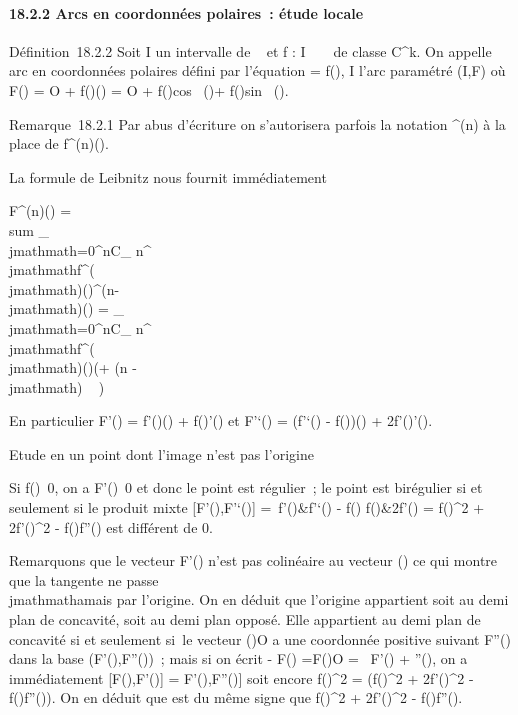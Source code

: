 \documentclass[]{article}
\begin{document}
\paragraph{18.2.2 Arcs en coordonnées polaires~: étude locale}

Définition~18.2.2 Soit I un intervalle de ~ et f : I \rightarrow~ ~ de classe
C^k. On appelle arc en coordonnées polaires défini par
l'équation \rho = f(\theta), \theta \in I l'arc paramétré (I,F) où F(\theta) = O +
f(\theta)\vecu(\theta) = O + f(\theta)cos~
(\theta)\vec\imath + f(\theta)sin~
(\theta).

Remarque~18.2.1 Par abus d'écriture on s'autorisera parfois la notation
\rho^(n) à la place de f^(n)(\theta).

La formule de Leibnitz nous fournit immédiatement

F^(n)(\theta) = \\sum
_\\jmathmath=0^nC_
n^\\jmathmathf^(\\jmathmath)(\theta)\vecu^(n-\\jmathmath)(\theta)
= \sum _\\jmathmath=0^nC_
n^\\jmathmathf^(\\jmathmath)(\theta)\vecu(\theta + (n - \\jmathmath) \pi~
 )

En particulier F'(\theta) = f'(\theta)\vecu(\theta) +
f(\theta)\vecu'(\theta) et F'`(\theta) = (f'`(\theta) -
f(\theta))\vecu(\theta) + 2f'(\theta)\vecu'(\theta).

Etude en un point dont l'image n'est pas l'origine

Si f(\theta)\neq~0, on a
F'(\theta)\neq~0 et donc le point est régulier~; le
point est birégulier si et seulement si le produit mixte
{[}F'(\theta),F'`(\theta){]} = \left
\matrix\,f'(\theta)&f'`(\theta) - f(\theta)
\cr f(\theta)&2f'(\theta) \right  =
f(\theta)^2 + 2f'(\theta)^2 - f(\theta)f''(\theta) est différent de 0.

Remarquons que le vecteur F'(\theta) n'est pas colinéaire au vecteur
\overrightarrowOF(\theta) ce qui montre que la tangente ne
passe \\jmathmathamais par l'origine. On en déduit que l'origine appartient soit
au demi plan de concavité, soit au demi plan opposé. Elle appartient au
demi plan de concavité si et seulement si~le vecteur
\overrightarrowF(\theta)O a une coordonnée positive
suivant F''(\theta) dans la base (F'(\theta),F''(\theta))~; mais si on écrit - F(\theta)
=\overrightarrow F(\theta)O = \lambda~F'(\theta) + \muF''(\theta), on a
immédiatement {[}F(\theta),F'(\theta){]} = \mu{[}F'(\theta),F''(\theta){]} soit encore
f(\theta)^2 = \mu(f(\theta)^2 + 2f'(\theta)^2 -
f(\theta)f''(\theta)). On en déduit que \mu est du même signe que f(\theta)^2
+ 2f'(\theta)^2 - f(\theta)f''(\theta).
\end{document}
